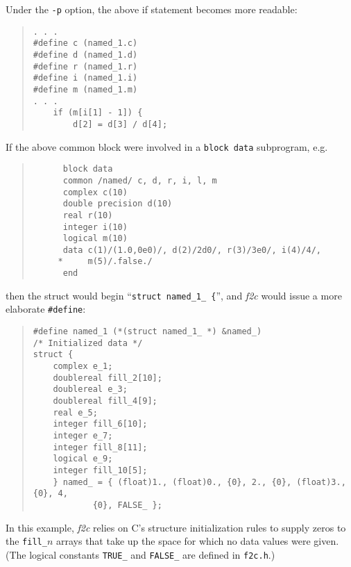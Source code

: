 \documentclass[10pt,a4paper]{article}
\begin{document}
Under the \verb|-p| option, the above if statement becomes more readable:
\begin{quote}
\begin{verbatim}
. . .
#define c (named_1.c)
#define d (named_1.d)
#define r (named_1.r)
#define i (named_1.i)
#define m (named_1.m)
. . .
    if (m[i[1] - 1]) {
        d[2] = d[3] / d[4];
\end{verbatim}
\end{quote}
If the above common block were involved in a \verb|block data| subprogram, e.g.
\begin{quote}
\begin{verbatim}
      block data
      common /named/ c, d, r, i, l, m
      complex c(10)
      double precision d(10)
      real r(10)
      integer i(10)
      logical m(10)
      data c(1)/(1.0,0e0)/, d(2)/2d0/, r(3)/3e0/, i(4)/4/,
     *     m(5)/.false./
      end
\end{verbatim}
\end{quote}
then the struct would begin ``\verb|struct named_1_ {|'', and \emph{f2c} would issue a more elaborate
\verb|#define|:
\begin{quote}
\begin{verbatim}
#define named_1 (*(struct named_1_ *) &named_)
/* Initialized data */
struct {
    complex e_1;
    doublereal fill_2[10];
    doublereal e_3;
    doublereal fill_4[9];
    real e_5;
    integer fill_6[10];
    integer e_7;
    integer fill_8[11];
    logical e_9;
    integer fill_10[5];
    } named_ = { (float)1., (float)0., {0}, 2., {0}, (float)3., {0}, 4,
            {0}, FALSE_ };
\end{verbatim}
\end{quote}
In this example, \emph{f2c} relies on C’s structure initialization rules to supply zeros to the \verb|fill_|$n$ arrays that take up the space for which no data values were given. (The logical constants \verb|TRUE_| and \verb|FALSE_| are defined in \verb|f2c.h|.)
\end{document}
